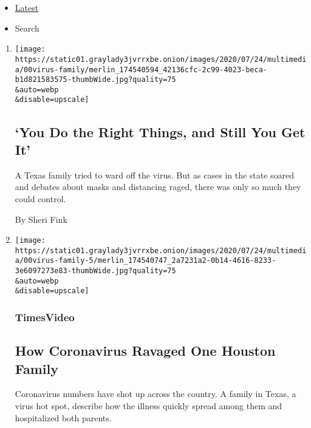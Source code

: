 \begin{itemize}
\tightlist
\item
  \protect\hyperlink{stream-panel}{Latest}
\item
  Search
\end{itemize}

\begin{enumerate}
\def\labelenumi{\arabic{enumi}.}
\item
  \href{/2020/07/26/us/coronavirus-family-houston-masks.html}{}

  \texttt{[image: https://static01.graylady3jvrrxbe.onion/images/2020/07/24/multimedia/00virus-family/merlin\_174540594\_42136cfc-2c99-4023-beca-b1d821583575-thumbWide.jpg?quality=75\\\&auto=webp\\\&disable=upscale]}

  \hypertarget{you-do-the-right-things-and-still-you-get-it}{%
  \subsection{`You Do the Right Things, and Still You Get
  It'}\label{you-do-the-right-things-and-still-you-get-it}}

  A Texas family tried to ward off the virus. But as cases in the state
  soared and debates about masks and distancing raged, there was only so
  much they could control.

  By Sheri Fink
\item
  \href{/video/us/100000007253343/coronavirus-houston-family.html}{}

  \texttt{[image: https://static01.graylady3jvrrxbe.onion/images/2020/07/24/multimedia/00virus-family-5/merlin\_174540747\_2a7231a2-0b14-4616-8233-3e6097273e83-thumbWide.jpg?quality=75\\\&auto=webp\\\&disable=upscale]}

  \hypertarget{timesvideo}{%
  \subsubsection{TimesVideo}\label{timesvideo}}

  \hypertarget{how-coronavirus-ravaged-one-houston-family}{%
  \subsection{How Coronavirus Ravaged One Houston
  Family}\label{how-coronavirus-ravaged-one-houston-family}}

  Coronavirus numbers have shot up across the country. A family in
  Texas, a virus hot spot, describe how the illness quickly spread among
  them and hospitalized both parents.


\end{enumerate}

